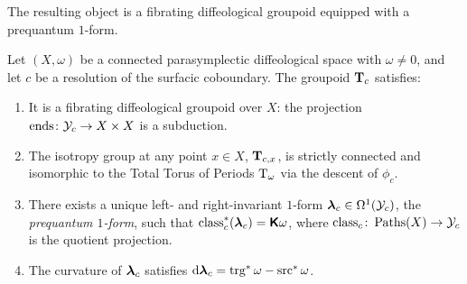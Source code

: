 \documentclass[11pt,reqno,letterpaper,twoside]{amsart}
\begin{document}
  \begin{article}
    \label{art:Structural Properties}
    
    The resulting object is a fibrating diffeological groupoid equipped with a prequantum $1$-form.
    
    \begin{theorem}
      Let $(X, \omega)$ be a connected parasymplectic diffeological space with $\omega \neq 0$,
      and let $c$ be a resolution of the surfacic coboundary.
      The groupoid $\mathbf{T}_c$ satisfies:
      \begin{enumerate}
        \item It is a fibrating diffeological groupoid over $X$:
        the projection $\operatorname{ends} \colon \mathcal{Y}_c \to X \times X$ is a subduction.
        \item The isotropy group at any point $x \in X$,
        $\mathbf{T}_{c, x}$,
        is strictly connected and isomorphic to the Total Torus of Periods $\mathrm{T}_\omega$ via the descent of $\phi_c$.
        \item There exists a unique left- and right-invariant $1$-form $\boldsymbol \lambda_c \in \Omega^1(\mathcal{Y}_c)$,
        the \emph{prequantum $1$-form},
        such that $\operatorname{class}_c^*(\boldsymbol \lambda_c) = \boldsymbol{\mathsf{K}}\omega$,
        where $\operatorname{class}_c \colon \operatorname{Paths}(X) \to \mathcal{Y}_c$ is the quotient projection.
        \item The curvature of $\boldsymbol \lambda_c$ satisfies $\mathrm{d}\boldsymbol \lambda_c = \operatorname{trg}^*\omega - \operatorname{src}^*\omega$.
      \end{enumerate}
    \end{theorem}
  \end{article}
  
\end{document}
